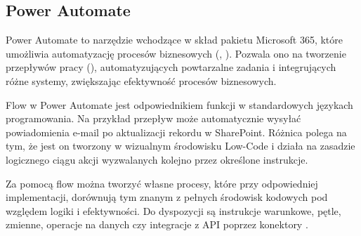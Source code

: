 \subsection{Power Automate }
Power Automate to narzędzie wchodzące w skład pakietu Microsoft 365, które umożliwia automatyzację procesów biznesowych (, ). Pozwala ono na tworzenie przepływów pracy (), automatyzujących powtarzalne zadania i integrujących różne systemy, zwiększając efektywność procesów biznesowych.

Flow w Power Automate jest odpowiednikiem funkcji w standardowych językach programowania. Na przykład przepływ może automatycznie wysyłać powiadomienia e-mail po aktualizacji rekordu w SharePoint. Różnica polega na tym, że jest on tworzony w wizualnym środowisku Low-Code i działa na zasadzie logicznego ciągu akcji wyzwalanych kolejno przez określone instrukcje.

Za pomocą flow można tworzyć własne procesy, które przy odpowiedniej implementacji, dorównują tym znanym z pełnych środowisk kodowych pod względem logiki i efektywności. Do dyspozycji są instrukcje warunkowe, pętle, zmienne, operacje na danych czy integracje z API poprzez konektory \texorpdfstring{\cite{v-aangie_official_nodate}}{}.
